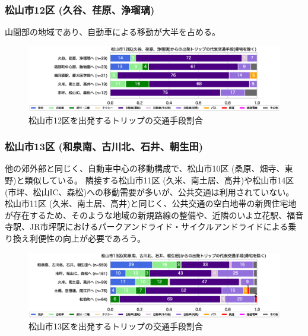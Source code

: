 \documentclass[a4paper,12pt, uplatex]{jsbook}
\begin{document}
\subsubsection{松山市12区 (久谷、荏原、浄瑠璃)}
山間部の地域であり、自動車による移動が大半を占める。
%
\begin{figure}[H]
    \centering
    \includegraphics[width=1.0\textwidth]{picture/mode_share_松山市12区.eps}
    \caption{松山市12区を出発するトリップの交通手段割合}
    \label{fig:mode_share_12}
\end{figure}

\subsubsection{松山市13区 (和泉南、古川北、石井、朝生田)}
他の郊外部と同じく、自動車中心の移動構成で、松山市10区 (桑原、畑寺、東野)と類似している。
隣接する松山市11区 (久米、南土居、高井)や松山市14区 (市坪、松山IC、森松)への移動需要が多いが、公共交通は利用されていない。
松山市11区 (久米、南土居、高井)と同じく、公共交通の空白地帯の新興住宅地が存在するため、そのような地域の新規路線の整備や、近隣のいよ立花駅、福音寺駅、JR市坪駅におけるパークアンドライド・サイクルアンドライドによる乗り換え利便性の向上が必要であろう。
%
\begin{figure}[H]
    \centering
    \includegraphics[width=1.0\textwidth]{picture/mode_share_松山市13区.eps}
    \caption{松山市13区を出発するトリップの交通手段割合}
    \label{fig:mode_share_13}
\end{figure}
\end{document}
